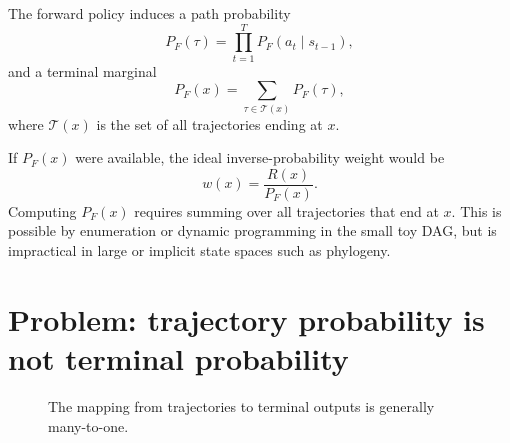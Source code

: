 \documentclass[11pt]{article}
\newcommand{\PF}{P_F}
\newcommand{\Tset}{\mathcal{T}}
\newcommand{\R}{R}
\begin{document}
The forward policy induces a path probability
\begin{equation}
    \PF(\tau)
    =
    \prod_{t=1}^{T}\PF(a_t\mid s_{t-1}),
    \label{eq:forward-path-probability}
\end{equation}
and a terminal marginal
\begin{equation}
    \PF(x)
    =
    \sum_{\tau\in\Tset(x)}\PF(\tau),
    \label{eq:terminal-probability}
\end{equation}
where \(\Tset(x)\) is the set of all trajectories ending at \(x\).

If \(\PF(x)\) were available, the ideal inverse-probability weight would be
\begin{equation}
    w(x)=\frac{\R(x)}{\PF(x)}.
\end{equation}
Computing \(\PF(x)\) requires summing over all trajectories that end at \(x\). This is possible by enumeration or dynamic programming in the small toy DAG, but is impractical in large or implicit state spaces such as phylogeny.

\section{Problem: trajectory probability is not terminal probability}
\label{sec:multiplicity}

\begin{figure}[t]
\centering
{}
\caption{The mapping from trajectories to terminal outputs is generally many-to-one.}
\label{fig:trajectory-terminal}
\end{figure}
\end{document}
